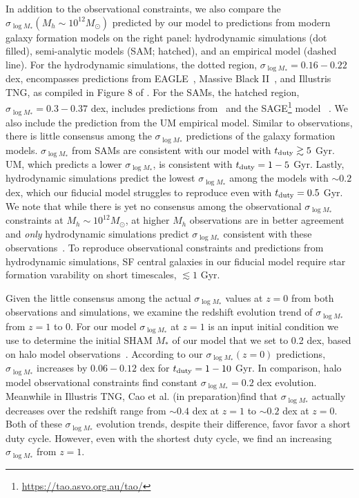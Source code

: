 \documentclass[12pt, letterpaper, preprint, tighten]{aastex62}
\newcommand{\edt}[1]{{\color{dred}{\bf} #1}}
\newcommand{\cao}{Cao et al. (in preparation)}
\newcommand{\siglogm}{\sigma_{\log M_*}}
\begin{document}
In addition to the observational constraints, we also compare the $\siglogm(M_h \sim 10^{12}M_\odot)$
predicted by our model to predictions from modern galaxy formation models
on the right panel: hydrodynamic simulations (dot filled), semi-analytic models
(SAM; hatched), and an empirical model (dashed line). For the hydrodynamic 
simulations, the dotted region, $\siglogm = 0.16 - 0.22$ dex, encompasses
predictions from EAGLE~\citep{matthee2017}, Massive Black II~\citep{khandai2015},
and Illustris TNG, as compiled in Figure 8 of \cite{wechsler2018}.
For the SAMs, the hatched region, $\siglogm = 0.3 - 0.37$ dex, includes predictions 
from~\cite{lu2014, somerville2012} and the SAGE\footnote{\url{https://tao.asvo.org.au/tao/}}
model~\edt{\citep{croton2016}}. We also include the prediction from the
\cite{behroozi2018} UM empirical model. 
\edt{Similar to observations, there is little consensus among the $\siglogm$ 
predictions of the galaxy formation models.} 
$\siglogm$ from SAMs are consistent with our model with $t_{\rm duty} \gtrsim 5$ Gyr. 
UM, which predicts a lower $\siglogm$, is consistent with $t_{\rm duty} = 1 - 5$ Gyr.
Lastly, hydrodynamic simulations predict the lowest $\siglogm$ among the models
\edt{with $\sim 0.2$ dex, which our fiducial model struggles to reproduce
even with $t_{\rm duty} = 0.5$ Gyr}. 
\edt{We note that while there is yet no consensus among the observational 
$\siglogm$ constraints at $M_h \sim 10^{12} M_\odot$, at higher $M_h$ observations 
are in better agreement and {\em only} hydrodynamic simulations predict $\siglogm$
consistent with these observations~\citep{wechsler2018}. To reproduce observational
constraints and predictions from hydrodynamic simulations, SF central galaxies
in our fiducial model require star formation varability on short timescales,
$\lesssim 1$ Gyr.}

\edt{Given the little consensus among the actual $\siglogm$ values at $z=0$ from both
observations and simulations, we examine the redshift evolution trend of $\siglogm$
from $z=1$ to 0. For our model $\siglogm$ at $z=1$ is an input initial condition we
use to determine the initial SHAM $M_*$ of our model that we set to 0.2 dex, based 
on halo model observations~\citep[\emph{e.g.}][]{leauthaud2012, tinker2013, patel2015}. 
According to our $\siglogm(z=0)$ predictions, $\siglogm$ increases by $0.06 - 0.12$ dex 
for $t_{\rm duty} = 1-10$ Gyr. In comparison, halo model observational constraints find 
constant $\siglogm=0.2$ dex evolution. Meanwhile in Illustris TNG, \cao find that $\siglogm$ 
actually decreases over the redshift range from $\sim 0.4$ dex at $z=1$ to $\sim 0.2$ dex 
at $z=0$. Both of these $\siglogm$ evolution trends, despite their difference, favor 
favor a short duty cycle. However, even with the shortest duty cycle, we find an 
increasing $\siglogm$ from $z=1$. 
} 
\end{document}
